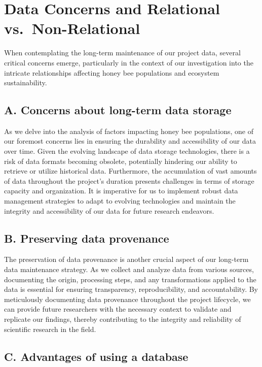 \documentclass[
  letterpaper,
  DIV=11,
  numbers=noendperiod]{scrartcl}
\begin{document}
\section{Data Concerns and Relational
vs.~Non-Relational}\label{data-concerns-and-relational-vs.-non-relational}

When contemplating the long-term maintenance of our project data,
several critical concerns emerge, particularly in the context of our
investigation into the intricate relationships affecting honey bee
populations and ecosystem sustainability.

\subsection{A. Concerns about long-term data
storage}\label{a.-concerns-about-long-term-data-storage}

As we delve into the analysis of factors impacting honey bee
populations, one of our foremost concerns lies in ensuring the
durability and accessibility of our data over time. Given the evolving
landscape of data storage technologies, there is a risk of data formats
becoming obsolete, potentially hindering our ability to retrieve or
utilize historical data. Furthermore, the accumulation of vast amounts
of data throughout the project's duration presents challenges in terms
of storage capacity and organization. It is imperative for us to
implement robust data management strategies to adapt to evolving
technologies and maintain the integrity and accessibility of our data
for future research endeavors.

\subsection{B. Preserving data
provenance}\label{b.-preserving-data-provenance}

The preservation of data provenance is another crucial aspect of our
long-term data maintenance strategy. As we collect and analyze data from
various sources, documenting the origin, processing steps, and any
transformations applied to the data is essential for ensuring
transparency, reproducibility, and accountability. By meticulously
documenting data provenance throughout the project lifecycle, we can
provide future researchers with the necessary context to validate and
replicate our findings, thereby contributing to the integrity and
reliability of scientific research in the field.

\subsection{C. Advantages of using a
database}\label{c.-advantages-of-using-a-database}
\end{document}

